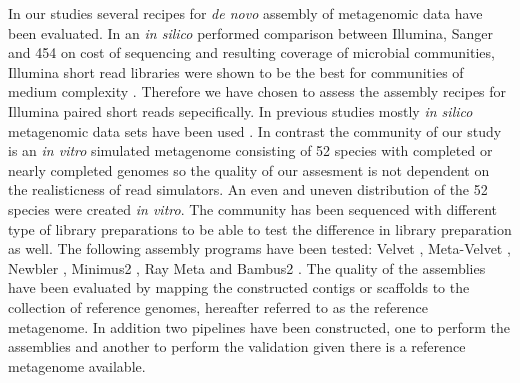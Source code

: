 
In our studies several recipes for {\em de novo} assembly of metagenomic
data have been evaluated. In an {\em in silico} performed comparison between
Illumina, Sanger and 454 on cost of sequencing and resulting coverage of
microbial communities, Illumina short read libraries were shown to be the best
for communities of medium complexity \cite{Mende22384016}. Therefore we have
chosen to assess the assembly recipes for Illumina paired short reads
sepecifically.  In previous studies mostly {\em in silico} metagenomic data
sets have been used \cite{Pignatelli21625384,Mavromatis17468765}. In contrast
the community of our study is an {\em in vitro} simulated metagenome consisting
of 52 species with completed or nearly completed genomes so the quality of our
assesment is not dependent on the realisticness of read simulators. An even and
uneven distribution of the 52 species were created {\em in vitro}. The community has
been sequenced with different type of library preparations to be able to test
the difference in library preparation as well.  The following assembly programs
have been tested: Velvet \cite{Zerbino18349386}, Meta-Velvet \cite{MetaVelvet},
Newbler \cite{Quinn18755037}, Minimus2 \cite{Sommer17324286}, Ray Meta
\cite{Boisvert23259615} and Bambus2 \cite{Koren21926123}. The quality of the
assemblies have been evaluated by mapping the constructed contigs or scaffolds
to the collection of reference genomes, hereafter referred to as the reference
metagenome. In addition two pipelines have been constructed, one to perform the
assemblies and another to perform the validation given there is a reference
metagenome available.\\


